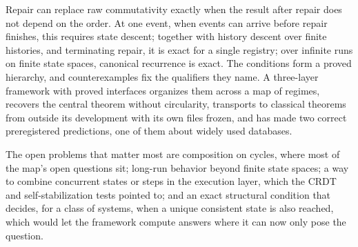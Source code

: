 Repair can replace raw commutativity exactly when the result after repair does not depend on the
order. At one event, when events can arrive before repair finishes, this requires state descent; together with history descent over finite histories,
and terminating repair, it is exact for a single registry; over infinite runs on finite state spaces,
canonical recurrence is exact. The conditions form a proved hierarchy, and counterexamples fix the
qualifiers they name. A three-layer framework with proved interfaces organizes them across a map of
regimes, recovers the central theorem without circularity, transports to classical theorems from
outside its development with its own files frozen, and has made two correct preregistered
predictions, one of them about widely used databases.

The open problems that matter most are composition on cycles, where most of the map's open questions
sit; long-run behavior beyond finite state spaces; a way to combine concurrent states or steps in the
execution layer, which the CRDT and self-stabilization tests pointed to; and an exact structural condition that decides, for a
class of systems, when a unique consistent state is also reached, which would let the framework compute
answers where it can now only pose the question.
